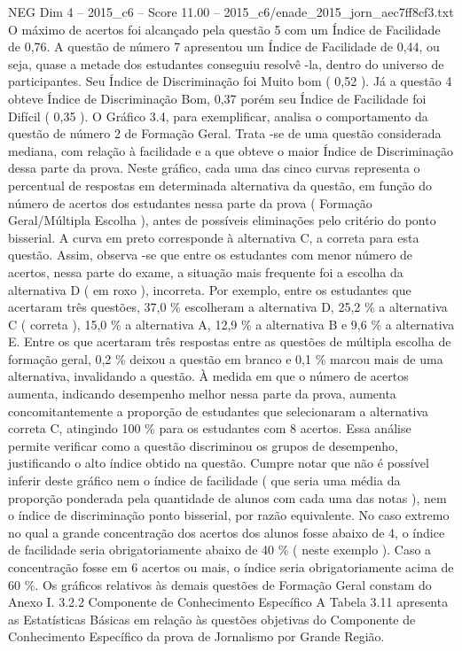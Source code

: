 \begin{textsample}{NEG Dim 4 – 2015\_c6 – Score 11.00 – 2015\_c6/enade\_2015\_jorn\_aec7ff8cf3.txt}
O máximo de acertos foi alcançado pela questão 5 com um Índice de Facilidade de 0,76.
A questão de número 7 apresentou um Índice de Facilidade de 0,44, ou seja, quase a metade dos estudantes conseguiu resolvê -la, dentro do universo de participantes.
Seu Índice de Discriminação foi Muito bom ( 0,52 ).
Já a questão 4 obteve Índice de Discriminação Bom, 0,37 porém seu Índice de Facilidade foi Difícil ( 0,35 ).
O Gráfico 3.4, para exemplificar, analisa o comportamento da questão de número 2 de Formação Geral.
Trata -se de uma questão considerada mediana, com relação à facilidade e a que obteve o maior Índice de Discriminação dessa parte da prova.
Neste gráfico, cada uma das cinco curvas representa o percentual de respostas em determinada alternativa da questão, em função do número de acertos dos estudantes nessa parte da prova ( Formação Geral/Múltipla Escolha ), antes de possíveis eliminações pelo critério do ponto bisserial.
A curva em preto corresponde à alternativa C, a correta para esta questão.
Assim, observa -se que entre os estudantes com menor número de acertos, nessa parte do exame, a situação mais frequente foi a escolha da alternativa D ( em roxo ), incorreta.
Por exemplo, entre os estudantes que acertaram três questões, 37,0 \% escolheram a alternativa D, 25,2 \% a alternativa C ( correta ), 15,0 \% a alternativa A, 12,9 \% a alternativa B e 9,6 \% a alternativa E.
Entre os que acertaram três respostas entre as questões de múltipla escolha de formação geral, 0,2 \% deixou a questão em branco e 0,1 \% marcou mais de uma alternativa, invalidando a questão.
À medida em que o número de acertos aumenta, indicando desempenho melhor nessa parte da prova, aumenta concomitantemente a proporção de estudantes que selecionaram a alternativa correta C, atingindo 100 \% para os estudantes com 8 acertos.
Essa análise permite verificar como a questão discriminou os grupos de desempenho, justificando o alto índice obtido na questão.
Cumpre notar que não é possível inferir deste gráfico nem o índice de facilidade ( que seria uma média da proporção ponderada pela quantidade de alunos com cada uma das notas ), nem o índice de discriminação ponto bisserial, por razão equivalente.
No caso extremo no qual a grande concentração dos acertos dos alunos fosse abaixo de 4, o índice de facilidade seria obrigatoriamente abaixo de 40 \% ( neste exemplo ).
Caso a concentração fosse em 6 acertos ou mais, o índice seria obrigatoriamente acima de 60 \%.
Os gráficos relativos às demais questões de Formação Geral constam do Anexo I. 3.2.2 Componente de Conhecimento Específico A Tabela 3.11 apresenta as Estatísticas Básicas em relação às questões objetivas do Componente de Conhecimento Específico da prova de Jornalismo por Grande Região.

\end{textsample}

